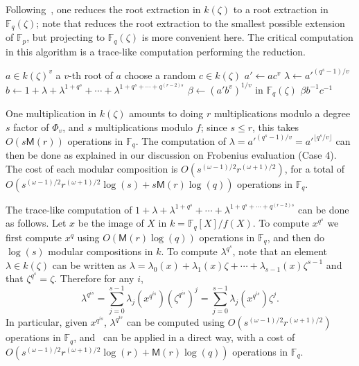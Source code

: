 \documentclass[12pt]{article}
\theoremstyle{plain}
\theoremstyle{definition}
\def\F{\ensuremath{\mathbb{F}}}
\def\MM{\ensuremath{\mathsf{M}}}
\newcounter{algorithm}
\begin{document}
Following~\cite[Algorithm~3]{doliskanischost2011}, one reduces the
root extraction in $k(\zeta)$ to a root extraction in $\F_q(\zeta)$;
note that \cite[Algorithm~3]{doliskanischost2011} reduces the root
extraction to the smallest possible extension of $\F_p$, but
projecting to $\F_q(\zeta)$ is more convenient here. The critical
computation in this algorithm is a trace-like computation performing
the reduction.

\begin{algorithm}
\label{algorithm:new}
\begin{algorithmic}[1]
\REQUIRE $a \in k(\zeta)^v$
\ENSURE a $v$-th root of $a$
\REPEAT
\STATE choose a random $c \in k(\zeta)$
\STATE $a'\leftarrow ac^v$
\STATE $\lambda \leftarrow {a'}^{(q^s-1)/v}$
\STATE $b \leftarrow 1 + \lambda + \lambda^{1+q^{s}} + \cdots + \lambda^{1+q^{s}+\cdots+q^{(r-2)s}}$
\STATE $\beta \leftarrow (a'b^v)^{1/v}$ in $\F_q(\zeta)$
\RETURN $\beta b^{-1}c^{-1}$
\end{algorithmic}
\end{algorithm}

One multiplication in $k(\zeta)$ amounts to doing $r$ multiplications
modulo a degree $s$ factor of $\Phi_v$, and $s$ multiplications modulo
$f$; since $s \le r$, this takes $O(s \MM(r))$ operations in $\F_q$.
The computation of $\lambda = {a'}^{(q^s - 1)/v}= {a'}^{\lfloor
  q^s/v\rfloor}$ can then be done as explained in our discussion on
Frobenius evaluation (Case 4). The cost of each modular composition
 is $O(s^{(\omega-1)/2} r^{(\omega+1)/2})$, for a 
total of $O(s^{(\omega-1)/2} r^{(\omega+1)/2}\log(s) +
s\MM(r)\log(q))$ operations in $\F_q$.


The trace-like computation of $1 + \lambda + \lambda^{1+q^{s}} +
\cdots + \lambda^{1+q^{s}+\cdots+q^{(r-2)s}}$ can be done as follows.
Let $x$ be the image of $X$ in $k=\F_q[X]/f(X)$.  To compute $x^{q^s}$
we first compute $x^q$ using $O(\MM(r)\log(q))$ operations in $\F_q$,
and then do $\log(s)$ modular compositions in $k$.  To compute
$\lambda^{q^s}$, note that an element $\lambda \in k(\zeta)$ can be
written as $\lambda = \lambda_0(x) + \lambda_1(x) \zeta + \cdots +
\lambda_{s - 1}(x) \zeta^{s - 1}$ and that $\zeta^{q^s} = \zeta$.
Therefore for any $i$,
\[
\lambda^{q^{i s}} = \sum_{j = 0}^{s - 1} \lambda_j(x^{q^{i s}}) \left(\zeta^{q^{i s}}\right)^j = \sum_{j = 0}^{s - 1} \lambda_j(x^{q^{i s}}) \zeta^j.
\]
In particular, given $x^{q^{i s}}$, $\lambda^{q^{is}}$ can be computed using $O(s^{(\omega-1)/2}r^{(\omega+1)/2})$ operations in $\F_q$,
and~\cite[Algorithm~2]{doliskanischost2011} can be applied in a direct
way, with a cost of $O(s^{(\omega-1)/2}r^{(\omega+1)/2}\log(r) + \MM(r)\log(q))$ operations in $\F_q$.
\end{document}
